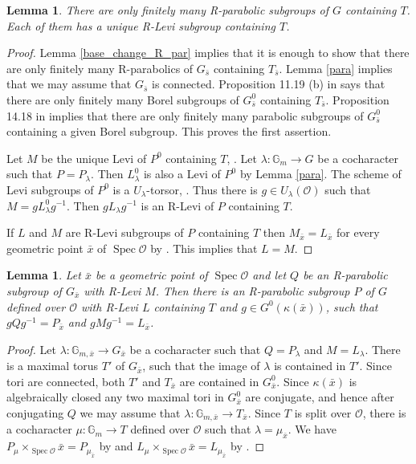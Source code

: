 \documentclass{amsart}
\newtheorem{lem}[prop]{Lemma}
\theoremstyle{definition}
\theoremstyle{remark}
\DeclareMathOperator{\Spec}{Spec}
\newcommand{\OO}{\mathcal O}
\newcommand{\Gm}{\mathbb G_{m}}
\newcommand{\xbar}{\bar{x}}
\renewcommand{\xbar}{\bar{x}}
\newcommand{\sbar}{\bar{s}}
\begin{document}
\begin{lem}\label{Rlevi} There are only finitely many R-parabolic subgroups of $G$ containing $T$. Each of them has a unique R-Levi subgroup 
containing $T$. 
\end{lem} 
\begin{proof} Lemma \ref{base_change_R_par} implies that it is enough to show that 
there are only finitely many R-parabolics of $G_{\sbar}$ containing $T_{\sbar}$. 
Lemma \ref{para} implies that we may assume that $G_{\sbar}$ is connected. 
Proposition 11.19 (b) in \cite{borel} says that there are only finitely many Borel subgroups of $G^0_{\bar{s}}$ containing $T_{\bar{s}}$. 
Proposition 14.18 in \cite{borel} implies that there are only finitely many parabolic subgroups of $G^0_{\bar{s}}$ containing a given Borel subgroup. This proves the first assertion.

Let $M$ be the unique Levi of $P^0$ containing $T$, \cite[Proposition 5.4.5]{bcnrd}. 
Let $\lambda: \Gm\rightarrow G$ be a cocharacter such that $P=P_{\lambda}$. Then $L^0_{\lambda}$ is also a Levi of $P^0$ by Lemma \ref{para}. The scheme of Levi subgroups of $P^0$ is a $U_{\lambda}$-torsor, \cite[Corollary 5.4.6]{bcnrd}. Thus 
there is $g\in U_{\lambda}(\OO)$ such that $M= g L^0_{\lambda} g^{-1}$. Then $g L_{\lambda} g^{-1}$ 
is an R-Levi of $P$ containing $T$. 

If $L$ and $M$ are R-Levi subgroups of $P$ containing $T$ then $M_{\xbar}=L_{\xbar}$ for every geometric point $\xbar$ of 
$\Spec \OO$ by \cite[Corollary 6.5]{BMR}. This implies that $L=M$.
\end{proof} 

\begin{lem}\label{conj_P} Let $\xbar$ be a geometric point of $\Spec \OO$ and let $Q$ be 
an R-parabolic subgroup of $G_{\xbar}$ with R-Levi $M$. Then there is an R-parabolic subgroup $P$ 
of $G$ defined over $\OO$ with R-Levi $L$ containing $T$ and $g\in G^0(\kappa(\xbar))$, such that 
$g Q g^{-1} = P_{\xbar}$ and $g M g^{-1} = L_{\xbar}$. 
\end{lem} 
\begin{proof} Let $\lambda: \mathbb G_{ m,\xbar}\rightarrow G_{\xbar}$ be a cocharacter 
such that $Q=P_{\lambda}$ and $M=L_{\lambda}$. There is a maximal torus $T'$ of $G_{\xbar}$, such that 
the image of $\lambda$ is contained in $T'$. Since tori are connected, both $T'$ and $T_{\xbar}$
are contained in $G^0_{\xbar}$. 
Since $\kappa(\xbar)$ is algebraically closed any two maximal tori in $G^0_{\xbar}$ are conjugate, 
and hence after conjugating $Q$ we may assume that $\lambda: \mathbb G_{ m,\xbar}\rightarrow T_{\xbar}$.
Since $T$ is split over $\OO$, there is a cocharacter $\mu: \Gm\rightarrow T$ defined 
over $\OO$ such that $\lambda= \mu_{\xbar}$. 
We have $P_\mu\times_{\Spec \OO} \xbar = P_{\mu_{\xbar}}$ by \cite[Lemma 2.1.4]{CGP} 
and $L_{\mu}\times_{\Spec \OO} \xbar = L_{\mu_{\xbar}}$ by \cite[Lemma 2.1.5]{CGP}.
\end{proof} 
\end{document}
